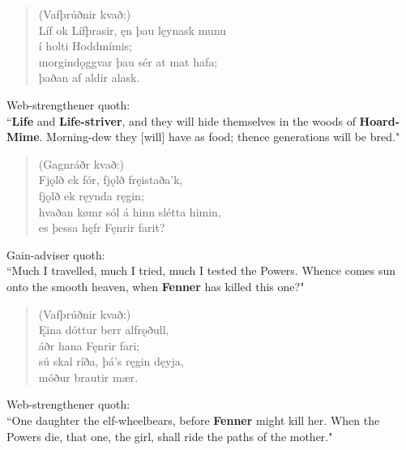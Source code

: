 \begin{verse}
(Vafþrúðnir kvað:) \\%
\bva Líf ok Lífþrasir, \hld ęn þau lęynask munu \\%
\ind í holti Hoddmímis; \\%
morgindǫggvar \hld þau sér at mat hafa; \\%
\ind þaðan af aldir alask.\\%
\end{verse}

\bvb Web-strengthener quoth: \\ “\textbf{Life} and \textbf{Life-striver}, and they will hide themselves in the woods of \textbf{Hoard-Mime}\footnotemark[85]. Morning-dew they [will] have as food; thence generations will be bred." \\

\begin{verse}
(Gagnráðr kvað:) \\%
\bva Fjǫlð ek fór, \hld fjǫlð fręistaða'k, \\%
\ind fjǫlð ek ręynda ręgin; \\%
hvaðan kømr sól \hld á hinn slétta himin, \\%
\ind es þessa hęfr Fęnrir farit?\\%
\end{verse}

\bvb Gain-adviser quoth: \\ “Much I travelled, much I tried, much I tested the Powers. Whence comes sun onto the smooth heaven, when \textbf{Fenner} has killed this one\footnotemark[90]?" \\

\begin{verse}
(Vafþrúðnir kvað:) \\%
\bva Ęina dóttur \hld berr alfrǫðull, \\%
\ind áðr hana Fęnrir fari; \\%
sú skal ríða, \hld þá's ręgin dęyja, \\%
\ind móður brautir mær.\\%
\end{verse}

\bvb Web-strengthener quoth: \\ “One daughter the elf-wheel\footnotemark[95] bears, before \textbf{Fenner} might kill her. When the Powers die, that one, the girl, shall ride the paths of the mother." \\


